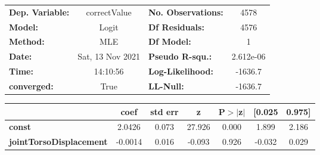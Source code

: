 \begin{center}
\begin{tabular}{lclc}
\toprule
\textbf{Dep. Variable:}         &   correctValue   & \textbf{  No. Observations:  } &     4578    \\
\textbf{Model:}                 &      Logit       & \textbf{  Df Residuals:      } &     4576    \\
\textbf{Method:}                &       MLE        & \textbf{  Df Model:          } &        1    \\
\textbf{Date:}                  & Sat, 13 Nov 2021 & \textbf{  Pseudo R-squ.:     } & 2.612e-06   \\
\textbf{Time:}                  &     14:10:56     & \textbf{  Log-Likelihood:    } &   -1636.7   \\
\textbf{converged:}             &       True       & \textbf{  LL-Null:           } &   -1636.7   \\
\bottomrule
\end{tabular}
\begin{tabular}{lcccccc}
                                & \textbf{coef} & \textbf{std err} & \textbf{z} & \textbf{P$> |$z$|$} & \textbf{[0.025} & \textbf{0.975]}  \\
\midrule
\textbf{const}                  &       2.0426  &        0.073     &    27.926  &         0.000        &        1.899    &        2.186     \\
\textbf{jointTorsoDisplacement} &      -0.0014  &        0.016     &    -0.093  &         0.926        &       -0.032    &        0.029     \\
\bottomrule
\end{tabular}
\end{center}